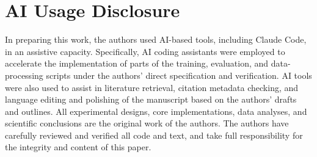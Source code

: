 \section*{AI Usage Disclosure}
In preparing this work, the authors used AI-based tools, including Claude Code, in an assistive capacity. Specifically, AI coding assistants were employed to accelerate the implementation of parts of the training, evaluation, and data-processing scripts under the authors' direct specification and verification. AI tools were also used to assist in literature retrieval, citation metadata checking, and language editing and polishing of the manuscript based on the authors' drafts and outlines. All experimental designs, core implementations, data analyses, and scientific conclusions are the original work of the authors. The authors have carefully reviewed and verified all code and text, and take full responsibility for the integrity and content of this paper.
